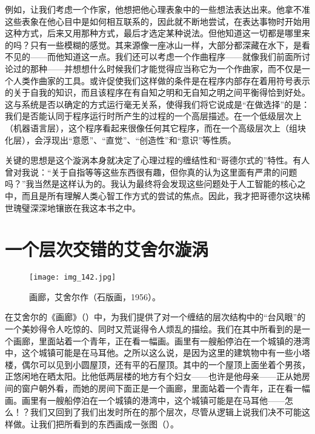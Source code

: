 例如，让我们考虑一个作家，他想把他心理表象中的一些想法表达出来。他拿不准这些表象在他心目中是如何相互联系的，因此就不断地尝试，在表达事物时开始用这种方式，后来又用那种方式，最后才选定某种说法。但他知道这一切都是哪里来的吗？只有一些模糊的感觉。其来源像一座冰山一样，大部分都深藏在水下，是看不见的——而他知道这一点。我们还可以考虑一个作曲程序——就像我们前面所讨论过的那种——并想想什么时候我们才能觉得应当称它为一个作曲家，而不仅是一个人类作曲家的工具。或许促使我们这样做的条件是在程序内部存在着用符号表示的关于自我的知识，而且该程序在有自知之明和无自知之明之间平衡得恰到好处。这与系统是否以确定的方式运行毫无关系，使得我们将它说成是“在做选择”的是：我们是否能认同于程序运行时所产生的过程的一个高层描述。在一个低级层次上（机器语言层），这个程序看起来很像任何其它程序，而在一个高级层次上（组块化层），会浮现出“意愿”、“直觉”、“创造性”和“意识”等性质。

关键的思想是这个漩涡本身就决定了心理过程的缠结性和“哥德尔式的”特性。有人曾对我说：“关于自指等等这些东西很有趣，但你真的认为这里面有严肃的问题吗？”我当然是这样认为的。我认为最终将会发现这些问题处于人工智能的核心之中，而且是所有理解人类心智工作方式的尝试的焦点。因此，我才把哥德尔这块稀世瑰璧深深地镶嵌在我这本书之中。

\section{一个层次交错的艾舍尔漩涡}

\begin{figure}
\texttt{[image: img\_142.jpg]}
\caption[画廊，艾舍尔作。]
  {画廊，艾舍尔作（石版画，1956）。}
\end{figure}

在艾舍尔的《画廊》（）中，为我们提供了对一个缠结的层次结构中的“台风眼”的一个美妙得令人吃惊的、同时又荒诞得令人烦乱的描绘。我们在其中所看到的是一个画廊，里面站着一个青年，正在看一幅画。画里有一艘船停泊在一个城镇的港湾中，这个城镇可能是在马耳他。之所以这么说，是因为这里的建筑物中有一些小塔楼，偶尔可以见到小圆屋顶，还有平的石屋顶。其中的一个屋顶上面坐着个男孩，正悠闲地在晒太阳。比他低两层楼的地方有个妇女——也许是他母亲——正从她房间的窗户朝外看，而她的房间下面正是一个画廊，里面站着一个青年，正在看一幅画。画里有一艘船停泊在一个城镇的港湾中，这个城镇可能是在马耳他——怎么！？我们又回到了我们出发时所在的那个层次，尽管从逻辑上说我们决不可能这样做。让我们把所看到的东西画成一张图（）。

